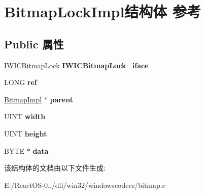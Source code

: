 \hypertarget{struct_bitmap_lock_impl}{}\section{Bitmap\+Lock\+Impl结构体 参考}
\label{struct_bitmap_lock_impl}
\subsection*{Public 属性}
\begin{DoxyCompactItemize}
\item 
\mbox{\label{struct_bitmap_lock_impl_ace844bfaac27d643f2614825caac6a43}} 
\hyperlink{interface_i_w_i_c_bitmap_lock}{I\+W\+I\+C\+Bitmap\+Lock} {\bfseries I\+W\+I\+C\+Bitmap\+Lock\+\_\+iface}
\item 
\mbox{\label{struct_bitmap_lock_impl_a647815a8bf4c99de0896deb2e1e4689e}} 
L\+O\+NG {\bfseries ref}
\item 
\mbox{\label{struct_bitmap_lock_impl_ac44d6091277fdfbce072fc4d18b97833}} 
\hyperlink{struct_bitmap_impl}{Bitmap\+Impl} $\ast$ {\bfseries parent}
\item 
\mbox{\label{struct_bitmap_lock_impl_a45574508bbe3e66f605aeaacbcca5d8e}} 
U\+I\+NT {\bfseries width}
\item 
\mbox{\label{struct_bitmap_lock_impl_abe92274430d32a2bfa2c008a329f20a5}} 
U\+I\+NT {\bfseries height}
\item 
\mbox{\label{struct_bitmap_lock_impl_a12170c3fcbf576fee6dd879a24252671}} 
B\+Y\+TE $\ast$ {\bfseries data}
\end{DoxyCompactItemize}


该结构体的文档由以下文件生成\+:\begin{DoxyCompactItemize}
\item 
E\+:/\+React\+O\+S-\/0../dll/win32/windowscodecs/bitmap.\+c\end{DoxyCompactItemize}
